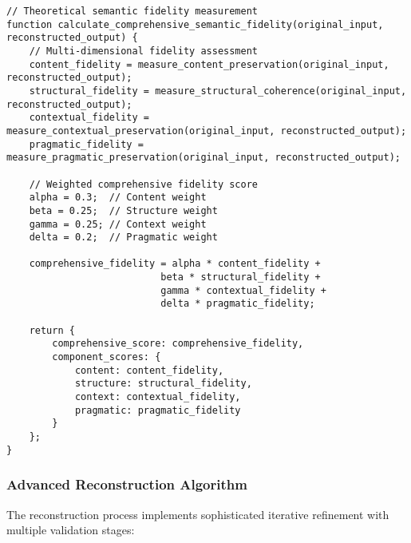 \documentclass[12pt,a4paper,twoside]{article}
\begin{document}
\begin{lstlisting}[caption=Comprehensive Semantic Fidelity Calculation]
// Theoretical semantic fidelity measurement
function calculate_comprehensive_semantic_fidelity(original_input, reconstructed_output) {
    // Multi-dimensional fidelity assessment
    content_fidelity = measure_content_preservation(original_input, reconstructed_output);
    structural_fidelity = measure_structural_coherence(original_input, reconstructed_output);
    contextual_fidelity = measure_contextual_preservation(original_input, reconstructed_output);
    pragmatic_fidelity = measure_pragmatic_preservation(original_input, reconstructed_output);

    // Weighted comprehensive fidelity score
    alpha = 0.3;  // Content weight
    beta = 0.25;  // Structure weight
    gamma = 0.25; // Context weight
    delta = 0.2;  // Pragmatic weight

    comprehensive_fidelity = alpha * content_fidelity +
                           beta * structural_fidelity +
                           gamma * contextual_fidelity +
                           delta * pragmatic_fidelity;

    return {
        comprehensive_score: comprehensive_fidelity,
        component_scores: {
            content: content_fidelity,
            structure: structural_fidelity,
            context: contextual_fidelity,
            pragmatic: pragmatic_fidelity
        }
    };
}
\end{lstlisting}

\subsubsection{Advanced Reconstruction Algorithm}

The reconstruction process implements sophisticated iterative refinement with multiple validation stages:
\end{document}
